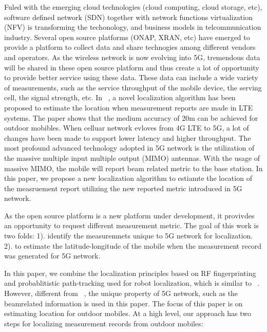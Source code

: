 \documentclass[conference, 10pt]{IEEEtran}
\begin{document}
Fuled with the emerging cloud technologies (cloud computing, cloud storage, etc), software defined network (SDN) together with 
network functions virtualization (NFV) is transforming the techonology, and business models in telcommunication industry.
Several open source platforms (ONAP, XRAN, etc) have emerged to provide a platform to collect data and share technogies among different 
vendors and operators. As the wireless network is now evolving into 5G, tremendous data will be shared in these open source platform and thus create 
a lot of opportunity to provide better service using these data. These data can include a wide variety of measurements, such as the service throughput of the mobile 
device, the serving cell, the signal strength, etc. In ~\cite{Pantelis2016Localization}, a novel localization algorithm has been proposed to estimate 
the location when measurement reports are made in LTE systems. The paper shows that the medium accuracy of 20m can be achieved for outdoor mobibles. 
When celluar network evloves from 4G LTE to 5G, a lot of changes have been made to support lower latency and higher throughput. The most profound advanced technology adopted in 5G
network is the utilization of the massive multiple input multiple output (MIMO) antennas. With the usage of massive MIMO, the mobile will report beam related metric to the base station. 
In this paper, we propose a new localization algorithm to estiamte the location of the measruement report utilizing the new reported metric introduced in 5G network.
 

As the open source platform is a new platform under development, it provivdes an opportunity to request different measurement 
metric. 
The goal of this work is two folds: 1). identify the measuremnets unique to 5G network for localization.
2). to estimate the latitude-longitude of the mobile when the measurement record was
generated for 5G network. 

In this paper, we combine the localization principles based on RF 
fingerprinting and probablitistic path-tracking used for robot localization, which is similar to ~\cite{Pantelis2016Localization}. However, different from ~\cite{Pantelis2016Localization}, the unique property of 5G network, such as the beamrelated 
information is used in this paper. The focus of this paper is on estimating location for outdoor mobiles. 
At a high level, our approach has two steps for
localizing measurement records from outdoor mobiles:
\end{document}
